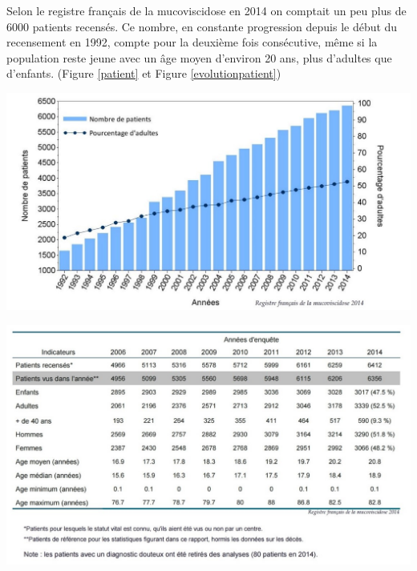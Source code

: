 Selon le registre français de la mucoviscidose en 2014 on comptait un peu plus de 6000 patients recensés. Ce nombre, en constante progression depuis le début du recensement en 1992, compte pour la deuxième fois consécutive, même si la population reste jeune avec un âge moyen d’environ 20 ans, plus d’adultes que d’enfants. (Figure \ref{patient} et Figure \ref{evolutionpatient})
\begin{center}
\includegraphics[scale=1]{gfx/patient.jpg} 
       \label{patient}
\end{center}
\begin{center}
\includegraphics[scale=1]{gfx/evolutionpatient.jpg} 
       \label{evolutionpatient}
\end{center}
